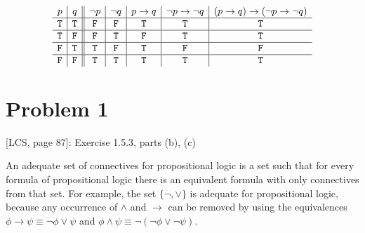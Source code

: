 \documentclass[12pt,leqno]{article}
\newcommand{\T}{\mathtt{T}}
\newcommand{\F}{\mathtt{F}}
\begin{document}
\begin{itemize}
\[
\begin{array}{ c | c || c | c | c | c | c }
  p & q & \lnot p & \lnot q & p \to q & \lnot p \to \lnot q &
    (p \to q) \to (\lnot p \to \lnot q) \\
\hline
  \T & \T & \F & \F & \T & \T & \T \\
\hline
  \T & \F & \F & \T & \F & \T & \T \\
\hline
  \F & \T & \T & \F & \T & \F & \F \\
\hline
  \F & \F & \T & \T & \T & \T & \T \\
\end{array}
\]
\medskip

\end{itemize}

\section*{Problem 1}

[LCS, page 87]: Exercise 1.5.3, parts (b), (c)

An adequate set of connectives for propositional logic is a set such that for
every formula of propositional logic there is an equivalent formula with only
connectives from that set. For example, the set $\{\lnot, \lor\}$ is adequate
for propositional logic, because any occurrence of $\land$ and $\to$ can be
removed by using the equivalences $\phi \to \psi \equiv \lnot \phi \lor \psi$
and $\phi \land \psi \equiv \lnot (\lnot \phi \lor \lnot \psi)$.
\end{document}
